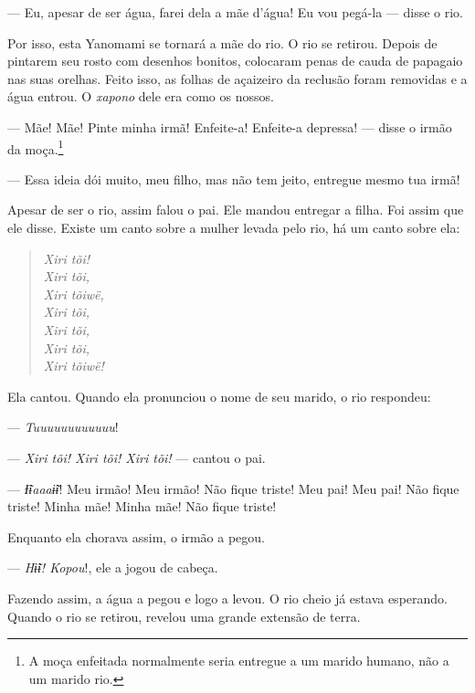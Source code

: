 --- Eu, apesar de ser água, farei dela a mãe d'água! Eu vou pegá-la ---
disse o rio. 

Por isso, esta Yanomami se tornará a mãe do rio. O rio se retirou.
Depois de pintarem seu rosto com desenhos bonitos, colocaram penas de
cauda de papagaio nas suas orelhas. Feito isso, as folhas de açaizeiro
da reclusão foram removidas e a água entrou. O \textit{xapono} dele era como os
nossos. 

--- Mãe! Mãe! Pinte minha irmã! Enfeite-a! Enfeite-a depressa! --- disse
o irmão da moça.\footnote{A moça enfeitada normalmente seria entregue a um marido humano, não a um
marido rio.}

--- Essa ideia dói muito, meu filho, mas não tem jeito, entregue mesmo
tua irmã! 

Apesar de ser o rio, assim falou o pai. Ele mandou entregar a filha.
Foi assim que ele disse. Existe um canto sobre a mulher levada pelo rio,
há um canto sobre ela:

\begin{verse}
\textit{Xiri tõi!\\
Xiri tõi,\\
Xiri tõiwë,\\
Xiri tõi,\\
Xiri tõi,\\
Xiri tõi,\\
Xiri tõiwë!}
\end{verse}

Ela cantou. Quando ela pronunciou o nome de seu marido, o rio
respondeu: 

--- \textit{Tuuuuuuuuuuuu}!

--- \textit{Xiri tõi! Xiri tõi! Xiri tõi!} --- cantou o pai. 


--- \textit{Ɨ̃ɨaaaɨ̃ɨ}! Meu irmão! Meu irmão! Não fique triste! Meu pai! Meu
 pai! Não fique triste! Minha mãe! Minha mãe! Não fique triste! 

Enquanto ela chorava assim, o irmão a pegou. 

--- \textit{Hɨ̃ɨ! Kopou}!, ele a jogou de cabeça. 

Fazendo assim, a água a pegou e logo a levou. O rio cheio já estava
esperando. Quando o rio se retirou, revelou uma grande extensão de
terra. 

